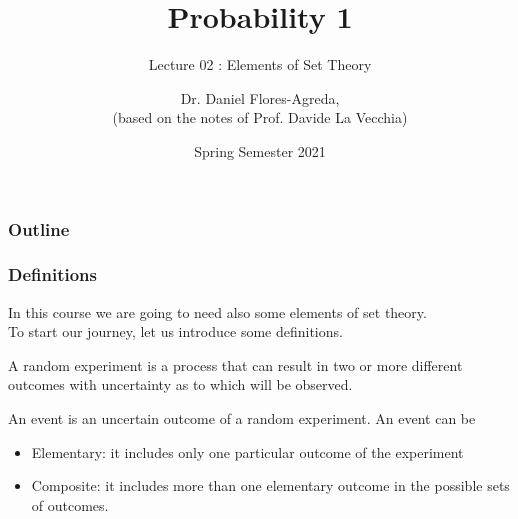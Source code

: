 \documentclass[notes=show,handout]{beamer}\usepackage[]{graphicx}\usepackage[]{color}
\begin{document}
\title[S110015]{Probability 1}
\subtitle{Lecture 02 : Elements of Set Theory}
\author[Flores-Agreda, La Vecchia]{Dr. Daniel Flores-Agreda, \\[0.5em] \tiny{(based on the notes of Prof. Davide La Vecchia)}}
\date{Spring Semester 2021}

\begin{frame}
\titlepage
\end{frame}

\begin{frame}
\frametitle{Outline}
\tableofcontents
\end{frame}



\begin{frame}
\frametitle{Definitions}

In this course we are going to need also some elements of \color{blue} set theory.\color{black}\\

To start our journey, let us introduce some definitions.

\begin{definition}
A random experiment  is a process that can result in two or more different outcomes with uncertainty as to which will be observed.
\end{definition}

\begin{definition}
An event is an uncertain outcome of a random experiment. An event can be
\begin{itemize}
\item Elementary: it includes only one particular outcome of the experiment
\item Composite: it includes more than one elementary outcome in the possible sets of outcomes.
\end{itemize}
\end{definition}

\end{frame}
\end{document}
